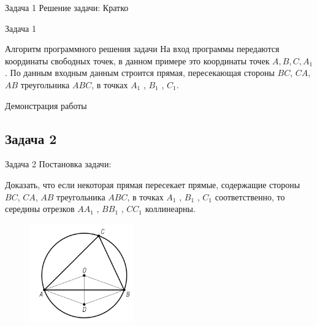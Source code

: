 \documentclass{beamer}
\begin{document}
\begin{frame}
   \begin{block}{Задача 1}
      Решение задачи:
      Кратко
   \end{block}
\end{frame}

\begin{frame}
   \begin{block}{Задача 1}
      \begin{block}{Алгоритм программного решения задачи}
         На вход программы передаются координаты свободных точек, в данном примере это координаты точек \(A,B,C,A_1\). По данным входным данным строится прямая, пересекающая стороны \(BC\), \(CA\), \(AB\) треугольника \(ABC\), в точках \(A_1\) , \(B_1\) , \(C_1\).
      \end{block}
   \end{block}
\end{frame}

\begin{frame}
   Демонстрация работы
\end{frame}

\begin{frame}
   \subsection{Задача 2}
   \begin{block}{Задача 2}
      Постановка задачи:

      Доказать, что если некоторая прямая пересекает прямые, содержащие стороны \(BC\), \(CA\), \(AB\) треугольника \(ABC\), в точках \(A_1\) , \(B_1\) , \(C_1\) соответственно, то середины отрезков \(AA_1\) , \(BB_1\) , \(CC_1\) коллинеарны.

      \begin{figure}[h]
         \centering
         \includegraphics[width=0.4\textwidth]{images/task1.png}
         \label{task2}
      \end{figure}
   \end{block}
\end{frame}
\end{document}
